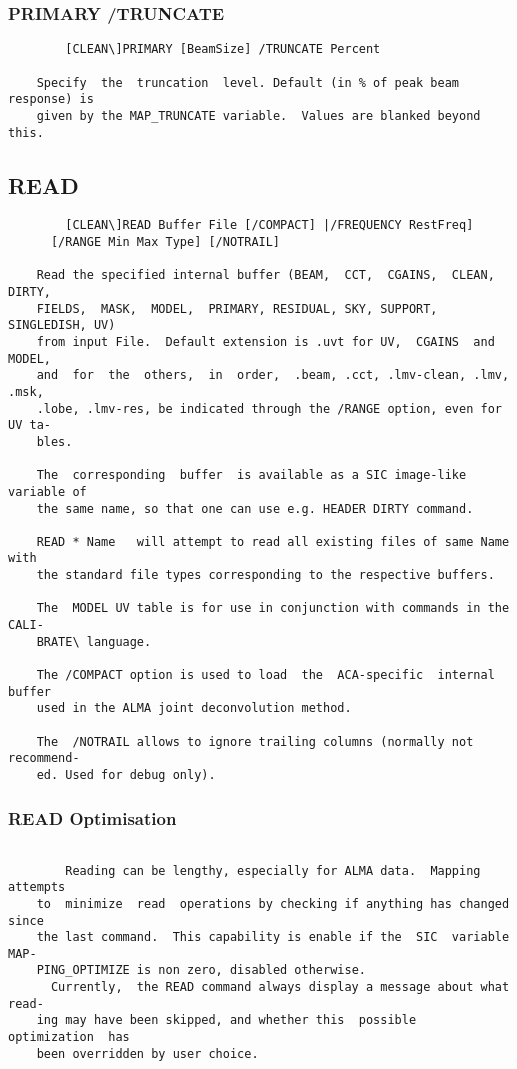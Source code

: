 \subsubsection{PRIMARY /TRUNCATE}
\begin{verbatim}
        [CLEAN\]PRIMARY [BeamSize] /TRUNCATE Percent

    Specify  the  truncation  level. Default (in % of peak beam response) is
    given by the MAP_TRUNCATE variable.  Values are blanked beyond this.

\end{verbatim}
\subsection{READ}
\begin{verbatim}
        [CLEAN\]READ Buffer File [/COMPACT] |/FREQUENCY RestFreq]
      [/RANGE Min Max Type] [/NOTRAIL]

    Read the specified internal buffer (BEAM,  CCT,  CGAINS,  CLEAN,  DIRTY,
    FIELDS,  MASK,  MODEL,  PRIMARY, RESIDUAL, SKY, SUPPORT, SINGLEDISH, UV)
    from input File.  Default extension is .uvt for UV,  CGAINS  and  MODEL,
    and  for  the  others,  in  order,  .beam, .cct, .lmv-clean, .lmv, .msk,
    .lobe, .lmv-res, be indicated through the /RANGE option, even for UV ta-
    bles.

    The  corresponding  buffer  is available as a SIC image-like variable of
    the same name, so that one can use e.g. HEADER DIRTY command.

    READ * Name   will attempt to read all existing files of same Name  with
    the standard file types corresponding to the respective buffers.

    The  MODEL UV table is for use in conjunction with commands in the CALI-
    BRATE\ language.

    The /COMPACT option is used to load  the  ACA-specific  internal  buffer
    used in the ALMA joint deconvolution method.

    The  /NOTRAIL allows to ignore trailing columns (normally not recommend-
    ed. Used for debug only).

\end{verbatim}
\subsubsection{READ Optimisation}
\begin{verbatim}

        Reading can be lengthy, especially for ALMA data.  Mapping  attempts
    to  minimize  read  operations by checking if anything has changed since
    the last command.  This capability is enable if the  SIC  variable  MAP-
    PING_OPTIMIZE is non zero, disabled otherwise.
      Currently,  the READ command always display a message about what read-
    ing may have been skipped, and whether this  possible  optimization  has
    been overridden by user choice.

\end{verbatim}
